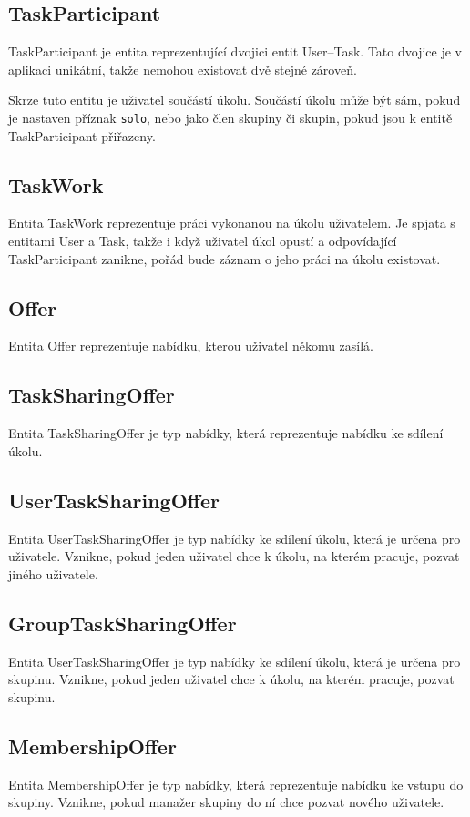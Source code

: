 \documentclass[thesis=B,czech]{FITthesis}[2012/06/26]
\begin{document}
		\subsection{TaskParticipant}
			TaskParticipant je entita reprezentující dvojici entit User--Task. Tato dvojice je v aplikaci unikátní, takže nemohou existovat dvě stejné zároveň. 
			
			Skrze tuto entitu je uživatel součástí úkolu. Součástí úkolu může být sám, pokud je nastaven příznak \texttt{solo}, nebo jako člen skupiny či skupin, pokud jsou k entitě TaskParticipant přiřazeny.
		
		\subsection{TaskWork}
			Entita TaskWork reprezentuje práci vykonanou na úkolu uživatelem. Je spjata s entitami User a Task, takže i když uživatel úkol opustí a odpovídající TaskParticipant zanikne, pořád bude záznam o jeho práci na úkolu existovat.
		
		\subsection{Offer}
			Entita Offer reprezentuje nabídku, kterou uživatel někomu zasílá.
		
		\subsection{TaskSharingOffer}
			Entita TaskSharingOffer je typ nabídky, která reprezentuje nabídku ke sdílení úkolu.
		
		\subsection{UserTaskSharingOffer}
			Entita UserTaskSharingOffer je typ nabídky ke sdílení úkolu, která je určena pro uživatele. Vznikne, pokud jeden uživatel chce k úkolu, na kterém pracuje, pozvat jiného uživatele.
		
		\subsection{GroupTaskSharingOffer}
			Entita UserTaskSharingOffer je typ nabídky ke sdílení úkolu, která je určena pro skupinu. Vznikne, pokud jeden uživatel chce k úkolu, na kterém pracuje, pozvat skupinu.
		
		\subsection{MembershipOffer}
			Entita MembershipOffer je typ nabídky, která reprezentuje nabídku ke vstupu do skupiny. Vznikne, pokud manažer skupiny do ní chce pozvat nového uživatele.
		
\end{document}
